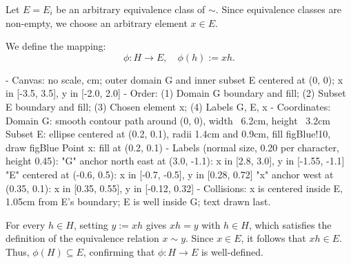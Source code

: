 \begin{content}
Let $E = E_i$ be an arbitrary equivalence class of $\sim$. Since equivalence classes are non-empty, we choose an arbitrary element $x \in E$.

We define the mapping:
\begin{equation}\label{eq:phi-map-def}
\phi \colon H \to E, \quad \phi(h) := xh.
\end{equation}

\begin{hidden}
- Canvas: no scale, cm; outer domain G and inner subset E centered at (0, 0); x in [-3.5, 3.5], y in [-2.0, 2.0]
- Order: (1) Domain G boundary and fill; (2) Subset E boundary and fill; (3) Chosen element x; (4) Labels G, E, x
- Coordinates:
  Domain G: smooth contour path around (0, 0), width ~6.2cm, height ~3.2cm
  Subset E: ellipse centered at (0.2, 0.1), radii 1.4cm and 0.9cm, fill figBlue!10, draw figBlue
  Point x: fill at (0.2, 0.1)
- Labels (normal size, 0.20 per character, height 0.45):
  "G" anchor north east at (3.0, -1.1): x in [2.8, 3.0], y in [-1.55, -1.1]
  "E" centered at (-0.6, 0.5): x in [-0.7, -0.5], y in [0.28, 0.72]
  "x" anchor west at (0.35, 0.1): x in [0.35, 0.55], y in [-0.12, 0.32]
- Collisions: x is centered inside E, 1.05cm from E's boundary; E is well inside G; text drawn last.
\end{hidden}
\begin{center}
\end{center}

\begin{steps}
For every $h \in H$, setting $y := xh$ gives $xh = y$ with $h \in H$, which satisfies the definition of the equivalence relation $x \sim y$. Since $x \in E$, it follows that $xh \in E$. Thus, $\phi(H) \subseteq E$, confirming that $\phi \colon H \to E$ is well-defined.
\end{steps}
\end{content}

